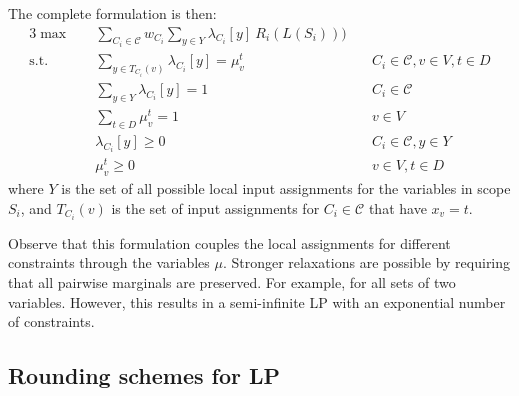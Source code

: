 The complete formulation is then:
\begin{alignat}{3}
\max \quad & \sum_{C_i \in \mathcal{C}} w_{C_i} \sum_{ y \in Y }  \lambda_{C_i}[y] \  R_i(L(S_i))) \label{eq:lp_strong}\\
\text{s.t.} \quad & 	\sum_{y \in T_{C_i}(v)} \lambda_{C_i}[y] = \mu_v^t & \quad C_i \in \mathcal{C}, v \in V, t \in D \nonumber \\
& \sum_{y \in Y} \lambda_{C_i}[ y ] = 1 & \quad  C_i \in \mathcal{C} \nonumber\\
& \sum_{t \in D} \mu_v^t = 1 & \quad v \in V \nonumber\\
& \lambda_{C_i}[ y ] \ge 0 & \quad C_i \in \mathcal{C}, y \in Y \nonumber\\
&	\mu_v^t \ge 0	& \quad v \in  V, t \in D \nonumber
\end{alignat}
where $Y$ is the set of all possible local input assignments for the variables in scope $S_i$, and $T_{C_i}(v)$ is the set of input assignments for $C_i \in \mathcal{C}$ that have $x_v = t$.

Observe that this formulation couples the local assignments for different constraints through the variables $\mu$. Stronger relaxations are possible by requiring that all pairwise marginals are preserved. For example, for all sets of two variables. However, this results in a semi-infinite LP with an exponential number of constraints. 



\subsection{Rounding schemes for LP}